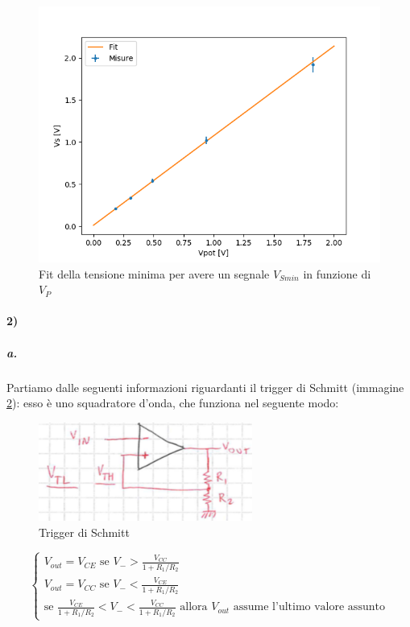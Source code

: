 \documentclass{article}
\begin{document}
		\begin{figure}
			\centering
			\includegraphics[width=\linewidth]{immagini/1c-2.png}
			\caption{Fit della tensione minima per avere un segnale $V_{Smin}$ in funzione di $V_{P}$}
			\label{fit:1c-2}
		\end{figure}
		\newpage



	\paragraph{2)}
	\subparagraph{a.}
		Partiamo dalle seguenti informazioni riguardanti il trigger di Schmitt (immagine \ref{fig:smith}): esso è uno squadratore d'onda, che funziona nel seguente modo:\newline
		\begin{figure}
			\centering
			\includegraphics[width=70mm]{immagini/smitha.png}
			\caption{Trigger di Schmitt}
			\label{fig:smith}
		\end{figure}
		\begin{equation}
			\begin{cases}
				V_{out}=V_{CE}\textrm{ se }V_->\frac{V_{CC}}{1+R_1/R_2}\\
				V_{out}=V_{CC}\textrm{ se }V_-<\frac{V_{CE}}{1+R_1/R_2}\\
				\textrm{se }\frac{V_{CE}}{1+R_1/R_2}<V_-<\frac{V_{CC}}{1+R_1/R_2}\textrm{ allora }V_{out}\textrm{ assume l'ultimo valore assunto}
			\end{cases}
		\end{equation}
\end{document}
